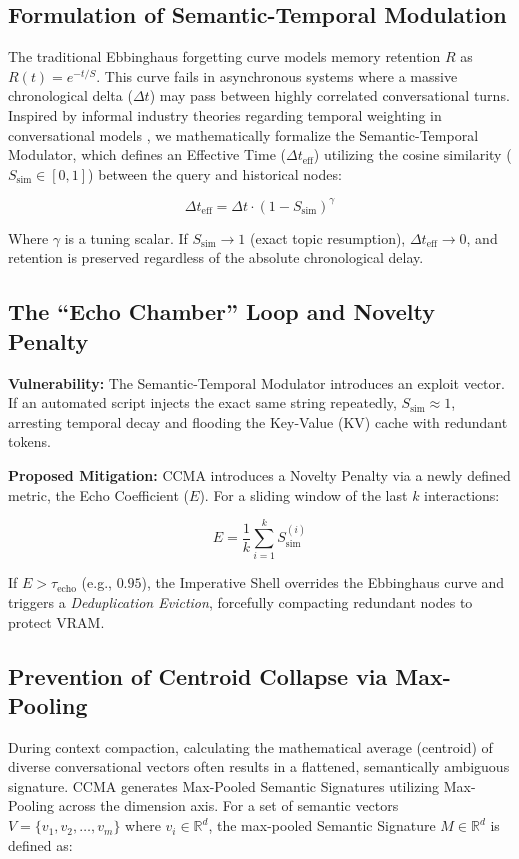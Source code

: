 \documentclass[11pt, a4paper]{article}
\begin{document}
	\subsection{Formulation of Semantic-Temporal Modulation}
	The traditional Ebbinghaus forgetting curve \cite{ebbinghaus1885} models memory retention $R$ as $R(t) = e^{-t/S}$. This curve fails in asynchronous systems where a massive chronological delta ($\Delta t$) may pass between highly correlated conversational turns. Inspired by informal industry theories regarding temporal weighting in conversational models \cite{synth_temporal}, we mathematically formalize the Semantic-Temporal Modulator, which defines an Effective Time ($\Delta t_{\text{eff}}$) utilizing the cosine similarity ($S_{\text{sim}} \in [0,1]$) between the query and historical nodes:
	
	\begin{equation}
		\Delta t_{\text{eff}} = \Delta t \cdot (1 - S_{\text{sim}})^\gamma
	\end{equation}
	
	Where $\gamma$ is a tuning scalar. If $S_{\text{sim}} \to 1$ (exact topic resumption), $\Delta t_{\text{eff}} \to 0$, and retention is preserved regardless of the absolute chronological delay.
	
	\subsection{The ``Echo Chamber'' Loop and Novelty Penalty}
	\textbf{Vulnerability:} The Semantic-Temporal Modulator introduces an exploit vector. If an automated script injects the exact same string repeatedly, $S_{\text{sim}} \approx 1$, arresting temporal decay and flooding the Key-Value (KV) cache with redundant tokens.
	
	\noindent\textbf{Proposed Mitigation:} CCMA introduces a Novelty Penalty via a newly defined metric, the Echo Coefficient ($E$). For a sliding window of the last $k$ interactions:
	
	\begin{equation}
		E = \frac{1}{k} \sum_{i=1}^{k} S_{\text{sim}}^{(i)}
	\end{equation}
	
	If $E > \tau_{\text{echo}}$ (e.g., $0.95$), the Imperative Shell overrides the Ebbinghaus curve and triggers a \textit{Deduplication Eviction}, forcefully compacting redundant nodes to protect VRAM.
	
	\subsection{Prevention of Centroid Collapse via Max-Pooling}
	During context compaction, calculating the mathematical average (centroid) of diverse conversational vectors often results in a flattened, semantically ambiguous signature. CCMA generates Max-Pooled Semantic Signatures utilizing Max-Pooling across the dimension axis. For a set of semantic vectors $V = \{v_1, v_2, \dots, v_m\}$ where $v_i \in \mathbb{R}^d$, the max-pooled Semantic Signature $M \in \mathbb{R}^d$ is defined as:
	
\end{document}
